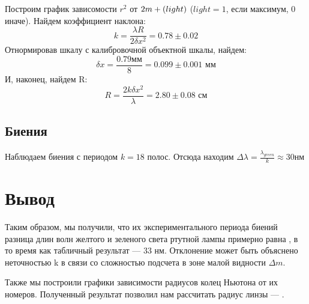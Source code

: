 \documentclass[a4paper,12pt]{article}
\begin{document}
\begin{table}
\begin{minipage}{0.5\textwidth}
\begin{center}
    \end{center}
\end{minipage}

\end{table}

Построим график зависомости $r^2$ от $2m+\text(light)$ ($light = 1$, если максимум, 
$0$ иначе). Найдем коэффициент наклона:
\begin{equation*}
    k = \frac{\lambda R}{2\delta x^2} = 0.78 \pm 0.02
\end{equation*}
Отнормировав шкалу с калибровочной объектной шкалы, найдем:
\begin{equation*}
    \delta x = \frac{0.79\text{мм}}{8} = 0.099 \pm 0.001 \text{ мм}
\end{equation*}
И, наконец, найдем R:
\begin{equation*}
    R = \frac{2k\delta x^2}{\lambda} = 2.80\pm0.08 \text{ см}
\end{equation*}

\subsection*{Биения}

Наблюдаем биения с периодом $k = 18$ полос. Отсюда находим $\Delta \lambda = \frac{\lambda_{green}}{k} \approx 30\text{нм}$

\section{Вывод}
	
Таким образом, мы получили, что их экспериментального периода биений разница длин волн  желтого и зеленого света ртутной лампы примерно равна , в то время как табличный результат --- 33 нм. Отклонение может быть объяснено неточностью k в связи со сложностью подсчета в зоне малой видности $ \Delta m $.
	
Также мы построили графики зависимости радиусов колец Ньютона от их номеров. Полученный результат позволил нам рассчитать радиус линзы ---  .
\end{document}
